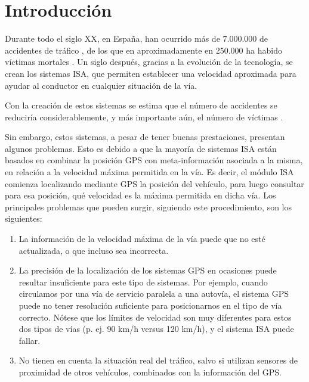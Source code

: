 
\chapter{Introducción} 


Durante todo el siglo XX, en España, han ocurrido más de 7.000.000 de accidentes de tráfico \cite{sigloXX}, de los que en aproximadamente en 250.000 ha habido víctimas mortales \cite{vidas}. Un siglo después, gracias a la evolución de la tecnología, se crean los sistemas \ac{ISA}, que permiten establecer una velocidad aproximada para ayudar al conductor en cualquier situación de la vía.


Con la creación de estos sistemas se estima que el número de accidentes se reduciría considerablemente, y más importante aún, el número de víctimas \cite{reduccion}.


Sin embargo, estos sistemas, a pesar de tener buenas prestaciones, presentan algunos problemas. Esto es debido a que la mayoría de sistemas \ac{ISA} están basados en combinar la posición \ac{GPS} con meta-información asociada a la misma, en relación a la velocidad máxima permitida en la vía. Es decir, el módulo ISA comienza localizando mediante GPS la posición del vehículo, para luego consultar para esa posición, qué velocidad es la máxima permitida en dicha vía. Los principales problemas que pueden surgir, siguiendo este procedimiento, son los siguientes:
\begin{enumerate}
\item La información de la velocidad máxima de la vía puede que no esté actualizada, o que incluso sea incorrecta.
\item La precisión de la localización de los sistemas GPS en ocasiones puede resultar insuficiente para este tipo de sistemas. Por ejemplo, cuando circulamos por una vía de servicio paralela a una autovía, el sistema GPS puede no tener resolución suficiente para posicionarnos en el tipo de vía correcto. Nótese que los límites de velocidad son muy diferentes para estos dos tipos de vías (p. ej. 90 km/h versus 120 km/h), y el sistema ISA puede fallar.
\item No tienen en cuenta la situación real del tráfico, salvo si utilizan sensores de proximidad de otros vehículos, combinados con la información del GPS.
\end{enumerate}


